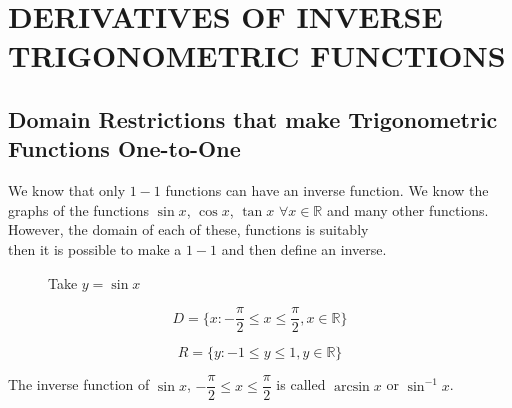 \documentclass[11pt,a4paper]{article}
\begin{document}
\pagebreak
\section{DERIVATIVES OF INVERSE TRIGONOMETRIC FUNCTIONS}


\subsection{Domain Restrictions that make Trigonometric Functions One-to-One}
We know that only $1-1$ functions can have an inverse function. We know the graphs of the functions $\sin x$, $\cos x$, $\tan x$ $\forall x \in \mathbb{R}$ and many other functions.\\
However, the domain of each of these, functions is suitably\\
then it is possible to make a $1-1$ and then define an inverse.\\



\begin{figure}[H]
\centering
Take $y=\sin x$\\
\end{figure}


$$D=\bigg\{x:-\dfrac{\pi}{2}\leq x \leq \frac{\pi}{2}, x\in \mathbb{R}\bigg\}$$

$$R=\bigg\{y:-1\leq y \leq 1, y\in \mathbb{R}\bigg\}$$

\begin{figure}[H]
\centering
{}
\end{figure}

The inverse function of $\sin x$, $-\dfrac{\pi}{2}\leq x \leq \dfrac{\pi}{2}$ is called $\arcsin x$ or $\sin^{-1}x$.\\\\
\end{document}
